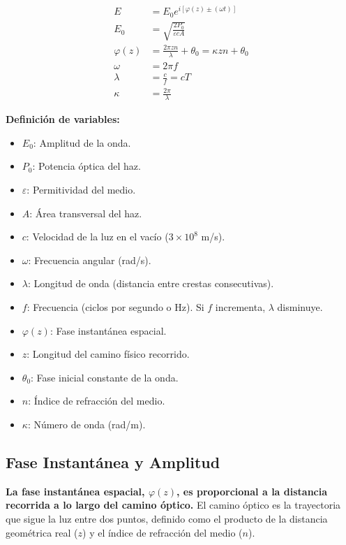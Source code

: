 \documentclass[12pt]{article}
\begin{document}
	\vspace{0.5cm}
	\begin{minipage}{0.45\textwidth}
		\begin{align*}
			E &= E_0 e^{i[\varphi(z) \pm (\omega t)]} \\
			E_0 &= \sqrt{\frac{2P_0}{\varepsilon c A}} \\
			\varphi(z) &= \frac{2\pi z n}{\lambda} + \theta_0 = \kappa z n + \theta_0 \\
			\omega &= 2\pi f \\
			\lambda &= \frac{c}{f} = c T \\
			\kappa &= \frac{2\pi}{\lambda}
		\end{align*}
	\end{minipage}
	\hfill
	\begin{minipage}{0.5\textwidth}
		\textbf{Definición de variables:}
		\begin{itemize}
			\item $E_0$: Amplitud de la onda.
			\item $P_0$: Potencia óptica del haz.
			\item $\varepsilon$: Permitividad del medio.
			\item $A$: Área transversal del haz.
			\item $c$: Velocidad de la luz en el vacío ($3\times10^8$ m/s).
			\item $\omega$: Frecuencia angular (rad/s).
			\item $\lambda$: Longitud de onda (distancia entre crestas consecutivas).
			\item $f$: Frecuencia (ciclos por segundo o Hz). Si $f$ incrementa, $\lambda$ disminuye.
			\item $\varphi(z)$: Fase instantánea espacial.
			\item $z$: Longitud del camino físico recorrido.
			\item $\theta_0$: Fase inicial constante de la onda.
			\item $n$: Índice de refracción del medio.
			\item $\kappa$: Número de onda (rad/m).
		\end{itemize}
	\end{minipage}
	
	\subsection{Fase Instantánea y Amplitud}
	\textbf{La fase instantánea espacial, $\varphi(z)$, es proporcional a la distancia recorrida a lo largo del camino óptico.} El camino óptico es la trayectoria que sigue la luz entre dos puntos, definido como el producto de la distancia geométrica real ($z$) y el índice de refracción del medio ($n$).
	
\end{document}
